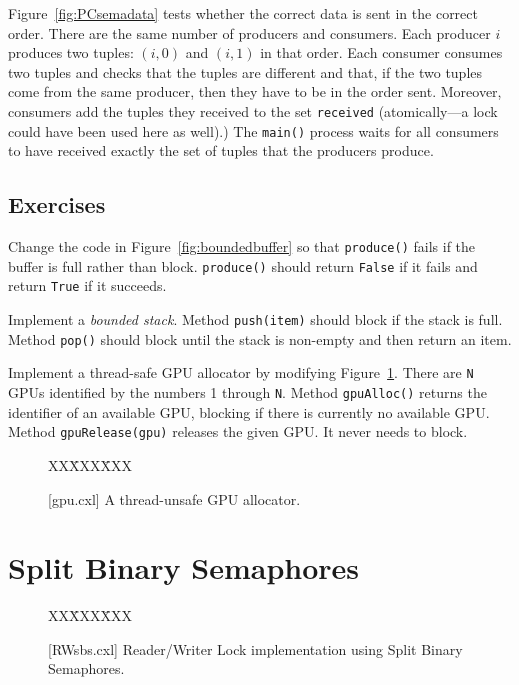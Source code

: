 \documentclass{report}
\newcommand{\cxlsource}[1]{
\begin{tabbing}
XX\=XXX\=XXX\kill
    
\end{tabbing}
}
\newenvironment{code}{
\tcolorbox
}{
\endtcolorbox
}
\begin{document}
Figure~\ref{fig:PCsemadata} tests whether the correct data is sent in
the correct order.  There are the same number of producers and consumers.
Each producer $i$ produces two tuples: $(i, 0)$ and $(i, 1)$ in that order.
Each consumer consumes two tuples and checks that the tuples are different
and that, if the two tuples come from the same producer, then they have to
be in the order sent.
Moreover, consumers add the tuples they received to the set
\texttt{received} (atomically---a lock could have been used here as well).)
The \texttt{main()} process waits for all consumers to have received
exactly the set of tuples that the producers produce.

\section*{Exercises}
\begin{problems}
\item Change the code in Figure~\ref{fig:boundedbuffer} so that
\texttt{produce()} fails if the buffer is full rather than block.
\texttt{produce()} should return \texttt{False} if it fails
and return \texttt{True} if it succeeds.
\item Implement a \emph{bounded stack}.  Method \texttt{push(item)}
should block if the stack is full.  Method \texttt{pop()} should block
until the stack is non-empty and then return an item.
\item \label{ex:gpu} Implement a thread-safe GPU allocator by modifying
Figure~\ref{fig:gpu}.
There are \texttt{N} GPUs identified by the numbers
1 through \texttt{N}.  Method \texttt{gpuAlloc()} returns the identifier
of an available GPU, blocking if there is currently no available GPU.
Method \texttt{gpuRelease(gpu)} releases the given GPU.  It never needs
to block.
\end{problems}

\begin{figure}
\begin{code}
\cxlsource{gpu}
\end{code}
\caption{[gpu.cxl] A thread-unsafe GPU allocator.}
\label{fig:gpu}
\end{figure}

\chapter{Split Binary Semaphores}
\label{ch:sbs}

\begin{figure}
\begin{code}
\cxlsource{RWsbs}
\end{code}
\caption{[RWsbs.cxl] Reader/Writer Lock implementation using Split Binary Semaphores.}
\label{fig:RWsplitsema}
\end{figure}
\end{document}
